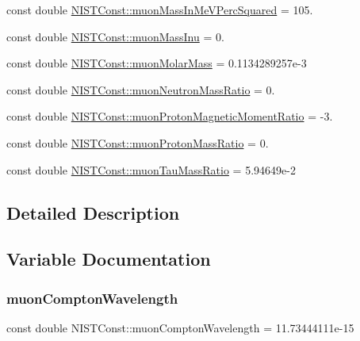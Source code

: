 \begin{DoxyCompactItemize}
\item 
const double \hyperlink{group___n_i_s_t_const-_muon_ga781e348a83468d065630fd1b6da85eab}{N\+I\+S\+T\+Const\+::muon\+Mass\+In\+Me\+V\+Perc\+Squared} = 105.
\item 
const double \hyperlink{group___n_i_s_t_const-_muon_gaa24722892f878b56a8aa97cca27ed908}{N\+I\+S\+T\+Const\+::muon\+Mass\+Inu} = 0.
\item 
const double \hyperlink{group___n_i_s_t_const-_muon_ga9211251167ca5318354df60b44939e60}{N\+I\+S\+T\+Const\+::muon\+Molar\+Mass} = 0.\+1134289257e-\/3
\item 
const double \hyperlink{group___n_i_s_t_const-_muon_ga8f63813d3e0283a611f3e66b6d0b681d}{N\+I\+S\+T\+Const\+::muon\+Neutron\+Mass\+Ratio} = 0.
\item 
const double \hyperlink{group___n_i_s_t_const-_muon_gae49d53271e3ee71dc74d718028782d06}{N\+I\+S\+T\+Const\+::muon\+Proton\+Magnetic\+Moment\+Ratio} = -\/3.
\item 
const double \hyperlink{group___n_i_s_t_const-_muon_ga72ca5408215ae40bb36ef1bff9107cf7}{N\+I\+S\+T\+Const\+::muon\+Proton\+Mass\+Ratio} = 0.
\item 
const double \hyperlink{group___n_i_s_t_const-_muon_gaaf24aa0c43f6d4a1935963fdd4c44789}{N\+I\+S\+T\+Const\+::muon\+Tau\+Mass\+Ratio} = 5.\+94649e-\/2
\end{DoxyCompactItemize}


\subsection{Detailed Description}


\subsection{Variable Documentation}
\mbox{\label{group___n_i_s_t_const-_muon_ga344399a1ac3bc2f57614ccdca4f4f1c1}} 
\subsubsection{\texorpdfstring{muon\+Compton\+Wavelength}{muonComptonWavelength}}
{\footnotesize\ttfamily const double N\+I\+S\+T\+Const\+::muon\+Compton\+Wavelength = 11.\+73444111e-\/15}

